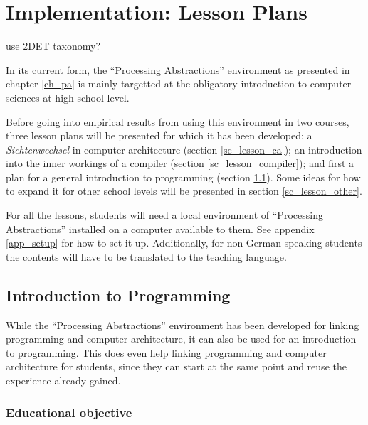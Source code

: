 
\chapter{Implementation: Lesson Plans} \label{ch_teaching}

\begin{todo}
\item use 2DET taxonomy? \cite{Sor13}
\end{todo}


In its current form, the ``Processing Abstractions'' environment as presented in chapter \ref{ch_pa} is mainly targetted at the obligatory introduction to computer sciences at high school level.

Before going into empirical results from using this environment in two courses, three lesson plans will be presented for which it has been developed: a \emph{Sichtenwechsel} in computer architecture (section \ref{sc_lesson_ca}); an introduction into the inner workings of a compiler (section \ref{sc_lesson_compiler}); and first a plan for a general introduction to programming (section \ref{sc_lesson_intro}). Some ideas for how to expand it for other school levels will be presented in section \ref{sc_lesson_other}.

For all the lessons, students will need a local environment of ``Processing Abstractions'' installed on a computer available to them. See appendix \ref{app_setup} for how to set it up. Additionally, for non-German speaking students the contents will have to be translated to the teaching language.



\section{Introduction to Programming} \label{sc_lesson_intro}

While the ``Processing Abstractions'' environment has been developed for linking programming and computer architecture, it can also be used for an introduction to programming. This does even help linking programming and computer architecture for students, since they can start at the same point and reuse the experience already gained.


\subsection{Educational objective}

